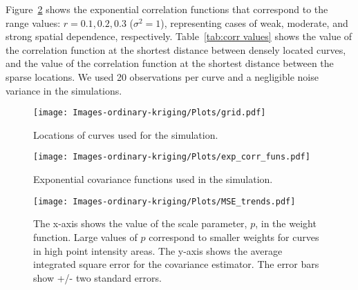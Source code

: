 Figure~\ref{fig:exp_corr_funs} shows the exponential correlation functions that correspond to the range values: $r = 0.1, 0.2, 0.3$ ($\sigma^2=1$), representing cases of weak, moderate, and strong spatial dependence, respectively. Table~\ref{tab:corr values} shows the value of the correlation function at the shortest distance between densely located curves, and the value of the correlation function at the shortest distance between the sparse locations. We used 20 observations per curve and a negligible noise variance in the simulations. 

\begin{figure}[h]
	\begin{center}
		\texttt{[image: Images-ordinary-kriging/Plots/grid.pdf]} 
	\end{center}
	\caption{Locations of curves used for the simulation.} \label{fig:grid3} 
\end{figure}

\begin{figure}[h]
	\begin{center}
		\texttt{[image: Images-ordinary-kriging/Plots/exp\_corr\_funs.pdf]} 
	\end{center}
	\caption{Exponential covariance functions used in the simulation.} \label{fig:exp_corr_funs} 
\end{figure}

\begin{figure}[h]
	\begin{center}
		\texttt{[image: Images-ordinary-kriging/Plots/MSE\_trends.pdf]} 
	\end{center}
	\caption{The x-axis shows the value of the scale parameter, $p$, in the weight function. Large values of $p$ correspond to smaller weights for curves in high point intensity areas. The y-axis shows the average integrated square error for the covariance estimator. The error bars show +/- two standard errors.} \label{fig:MSE_trends} 
\end{figure}


